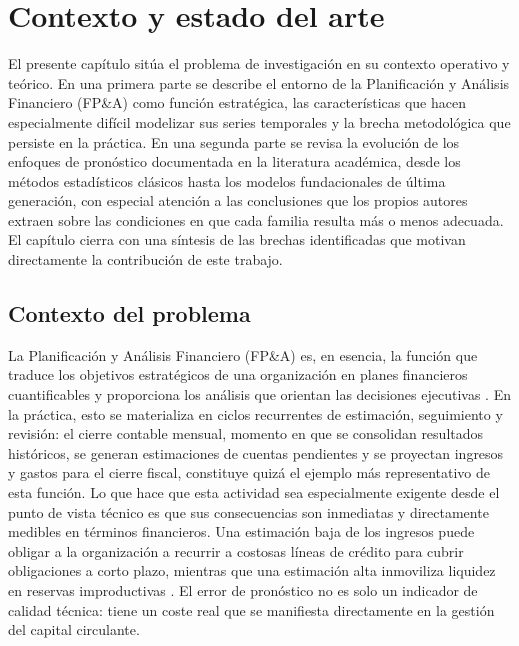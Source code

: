 \chapter{Contexto y estado del arte}
\label{cap:contexto}

El presente capítulo sitúa el problema de investigación en su contexto operativo y teórico. En una primera parte se describe el entorno de la Planificación y Análisis Financiero (FP\&A) como función estratégica, las características que hacen especialmente difícil modelizar sus series temporales y la brecha metodológica que persiste en la práctica. En una segunda parte se revisa la evolución de los enfoques de pronóstico documentada en la literatura académica, desde los métodos estadísticos clásicos hasta los modelos fundacionales de última generación, con especial atención a las conclusiones que los propios autores extraen sobre las condiciones en que cada familia resulta más o menos adecuada. El capítulo cierra con una síntesis de las brechas identificadas que motivan directamente la contribución de este trabajo.

\section{Contexto del problema}
\label{sec:contexto_problema}

La Planificación y Análisis Financiero (FP\&A) es, en esencia, la función que traduce los objetivos estratégicos de una organización en planes financieros cuantificables y proporciona los análisis que orientan las decisiones ejecutivas \parencite{Armstrong2001}. En la práctica, esto se materializa en ciclos recurrentes de estimación, seguimiento y revisión: el cierre contable mensual, momento en que se consolidan resultados históricos, se generan estimaciones de cuentas pendientes y se proyectan ingresos y gastos para el cierre fiscal, constituye quizá el ejemplo más representativo de esta función. Lo que hace que esta actividad sea especialmente exigente desde el punto de vista técnico es que sus consecuencias son inmediatas y directamente medibles en términos financieros. Una estimación baja de los ingresos puede obligar a la organización a recurrir a costosas líneas de crédito para cubrir obligaciones a corto plazo, mientras que una estimación alta inmoviliza liquidez en reservas improductivas \parencite{Petropoulos2022}. El error de pronóstico no es solo un indicador de calidad técnica: tiene un coste real que se manifiesta directamente en la gestión del capital circulante.

